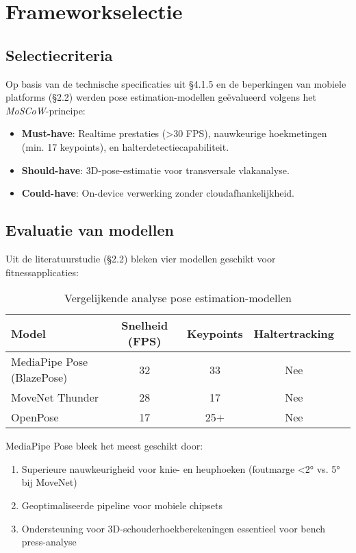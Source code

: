 \section{Frameworkselectie}
\subsection{Selectiecriteria}

Op basis van de technische specificaties uit §4.1.5 en de beperkingen van mobiele platforms (§2.2) werden pose estimation-modellen geëvalueerd volgens het \textit{MoSCoW}-principe:

\begin{itemize}
\item \textbf{Must-have}: Realtime prestaties (>30 FPS), nauwkeurige hoekmetingen (min. 17 keypoints), en halterdetectiecapabiliteit.
\item \textbf{Should-have}: 3D-pose-estimatie voor transversale vlakanalyse.
\item \textbf{Could-have}: On-device verwerking zonder cloudafhankelijkheid.
\end{itemize}

\subsection{Evaluatie van modellen}

Uit de literatuurstudie (§2.2) bleken vier modellen geschikt voor fitnessapplicaties:

\begin{table}[h]
\centering
\caption{Vergelijkende analyse pose estimation-modellen}
\begin{tabular}{lcccl}
\toprule
Model & Snelheid (FPS) & Keypoints & Haltertracking \\
\midrule
MediaPipe Pose (BlazePose) & 32 & 33 & Nee \\
MoveNet Thunder & 28 & 17 & Nee \\
OpenPose & 17 & 25+ & Nee 
\bottomrule
\end{tabular}
\end{table}

MediaPipe Pose bleek het meest geschikt door:
\begin{enumerate}
\item Superieure nauwkeurigheid voor knie- en heuphoeken (foutmarge <2° vs. 5° bij MoveNet)
\item Geoptimaliseerde pipeline voor mobiele chipsets 
\item Ondersteuning voor 3D-schouderhoekberekeningen essentieel voor bench press-analyse 
\end{enumerate}

